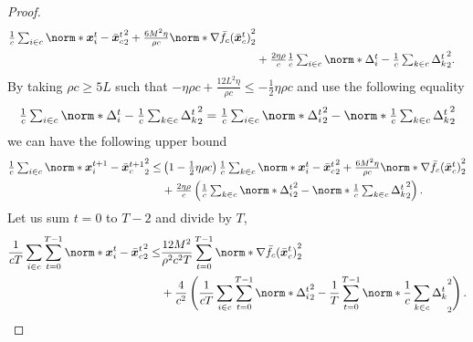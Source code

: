 \documentclass{article}
\begin{document}
\begin{proof}
\begin{align*}
    \tfrac{1}{c}\tsum_{i\in c} \norm*{\xx_i^{t} - \bar{\xx}_c^{t}}_2^2
    + \tfrac{6M^2\eta}{\rho c} \norm*{\nabla \bar{f}_c(\bar{\xx}_c^t)}_2^2 \\
    &+ \tfrac{2\eta\rho}{c}    \tfrac{1}{c}\tsum_{i\in c} \norm*{\Delta_i^t - \tfrac{1}{c}\tsum_{k\in c} \Delta_k^t }_2^2.
  \end{align*}
  By taking $\rho c \ge 5 L$ such that $-\eta\rho c + \tfrac{12L^2\eta}{\rho c}\le-\tfrac{1}{2}\eta\rho c$ and use the following equality
  \begin{align*}
    \tfrac{1}{c}\tsum_{i\in c} \norm*{\Delta_i^t - \tfrac{1}{c}\tsum_{k\in c} \Delta_k^t }_2^2 = \tfrac{1}{c}\tsum_{i\in c} \norm*{\Delta_i^t}_2^2 - \norm*{\tfrac{1}{c}\tsum_{k\in c} \Delta_k^t }_2^2
  \end{align*}
  we can have the following upper bound
  \begin{align*}
    \tfrac{1}{c}\tsum_{i\in c} \norm*{\xx_i^{t+1} - \bar{\xx}_c^{t+1}}_2^2
    \le& 
    \left(1-\tfrac{1}{2}\eta\rho c\right)
    \tfrac{1}{c}\tsum_{k\in c} \norm*{\xx_i^{t} - \bar{\xx}_c^{t}}_2^2
    + \tfrac{6M^2\eta}{\rho c} \norm*{\nabla \bar{f}_c(\bar{\xx}_c^t)}_2^2 \\
    &+ \tfrac{2\eta\rho}{c} \left(\tfrac{1}{c}\tsum_{k\in c} \norm*{\Delta_i^t}_2^2 - \norm*{\tfrac{1}{c}\tsum_{k\in c} \Delta_k^t }_2^2\right).
  \end{align*}
  Let us sum $t=0$ to $T-2$ and divide by $T$,
  \begin{align*}
    \frac{1}{cT}\sum_{i\in c}\sum_{t=0}^{T-1} \norm*{\xx_i^{t} - \bar{\xx}_c^{t}}_2^2
    \le& 
    \frac{12M^2}{\rho^2 c^2 T} \sum_{t=0}^{T-1} \norm*{\nabla \bar{f}_c(\bar{\xx}_c^t)}_2^2 \\
    & + \frac{4}{c^2} \left(\frac{1}{cT}\sum_{i\in c}\sum_{t=0}^{T-1} \norm*{\Delta_i^t}_2^2 - \frac{1}{T}\sum_{t=0}^{T-1}\norm*{\frac{1}{c}\sum_{k\in c} \Delta_k^t }_2^2\right).
  \end{align*}

\end{proof}
\end{document}
